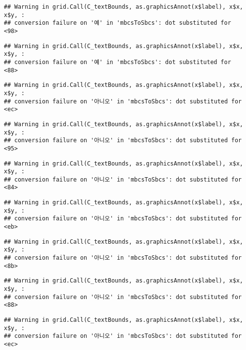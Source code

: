 \documentclass[
]{article}
\begin{document}
\begin{verbatim}
## Warning in grid.Call(C_textBounds, as.graphicsAnnot(x$label), x$x, x$y, :
## conversion failure on '예' in 'mbcsToSbcs': dot substituted for <98>
\end{verbatim}

\begin{verbatim}
## Warning in grid.Call(C_textBounds, as.graphicsAnnot(x$label), x$x, x$y, :
## conversion failure on '예' in 'mbcsToSbcs': dot substituted for <88>
\end{verbatim}

\begin{verbatim}
## Warning in grid.Call(C_textBounds, as.graphicsAnnot(x$label), x$x, x$y, :
## conversion failure on '아니오' in 'mbcsToSbcs': dot substituted for <ec>
\end{verbatim}

\begin{verbatim}
## Warning in grid.Call(C_textBounds, as.graphicsAnnot(x$label), x$x, x$y, :
## conversion failure on '아니오' in 'mbcsToSbcs': dot substituted for <95>
\end{verbatim}

\begin{verbatim}
## Warning in grid.Call(C_textBounds, as.graphicsAnnot(x$label), x$x, x$y, :
## conversion failure on '아니오' in 'mbcsToSbcs': dot substituted for <84>
\end{verbatim}

\begin{verbatim}
## Warning in grid.Call(C_textBounds, as.graphicsAnnot(x$label), x$x, x$y, :
## conversion failure on '아니오' in 'mbcsToSbcs': dot substituted for <eb>
\end{verbatim}

\begin{verbatim}
## Warning in grid.Call(C_textBounds, as.graphicsAnnot(x$label), x$x, x$y, :
## conversion failure on '아니오' in 'mbcsToSbcs': dot substituted for <8b>
\end{verbatim}

\begin{verbatim}
## Warning in grid.Call(C_textBounds, as.graphicsAnnot(x$label), x$x, x$y, :
## conversion failure on '아니오' in 'mbcsToSbcs': dot substituted for <88>
\end{verbatim}

\begin{verbatim}
## Warning in grid.Call(C_textBounds, as.graphicsAnnot(x$label), x$x, x$y, :
## conversion failure on '아니오' in 'mbcsToSbcs': dot substituted for <ec>
\end{verbatim}
\end{document}
